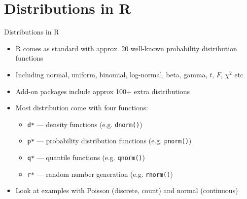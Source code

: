 \documentclass[aspectratio=169]{beamer}\usepackage[]{graphicx}\usepackage[]{color}
\begin{document}
\section{Distributions in R}
\begin{frame}{Distributions in R}
\begin{itemize}
  \item R comes as standard with approx. 20 well-known probability distribution functions
  \item Including normal, uniform, binomial, log-normal, beta, gamma, $t$, $F$, $\chi^2$ etc
  \item Add-on packages include approx 100+ extra distributions
  \item Most distribution come with four functions:
  \begin{itemize}
    \item \texttt{d*} --- density functions (e.g. \texttt{dnorm()})
    \item \texttt{p*} --- probability distribution functions (e.g. \texttt{pnorm()})
    \item \texttt{q*} --- quantile functions (e.g. \texttt{qnorm()})
    \item \texttt{r*} --- random number generation (e.g. \texttt{rnorm()})
  \end{itemize}
  \item Look at examples with Poisson (discrete, count) and normal (continuous)
\end{itemize}
\end{frame}
\end{document}
